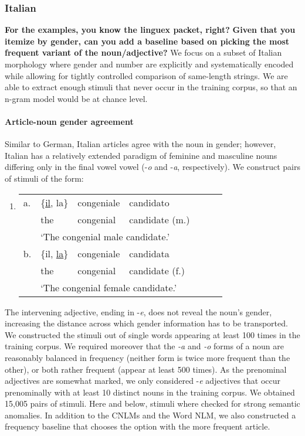 
\subsubsection{Italian} %
\textbf{For the examples, you know the linguex packet, right?}
\textbf{Given that you itemize by gender, can you add a baseline based
  on picking the most frequent variant of the noun/adjective?} We
focus on a subset of Italian morphology where gender and number are
explicitly and systematically encoded while allowing for tightly
controlled comparison of same-length strings. We are able to extract
enough stimuli that never occur in the training corpus, so that an
n-gram model would be at chance level.

\paragraph{Article-noun gender agreement}

Similar to German, Italian articles agree with the noun in gender; however, Italian has a relatively extended paradigm of feminine and masculine nouns differing only in the final vowel vowel (-\emph{o} and -\emph{a}, respectively). We construct pairs of stimuli of the form:
\begin{enumerate}[label={(\arabic*)}]
	\item 
		\begin{tabular}[t]{lllllll}
	a. & \{\underline{il}, la\} & congeniale & candidato \\
   &  the & congenial & candidate (m.) \\
	& \multicolumn{4}{l}{`The congenial male candidate.'} \\
	b. & \{il, \underline{la}\} & congeniale & candidata \\
    &the & congenial & candidate (f.) \\
	& \multicolumn{4}{l}{`The congenial female candidate.'} \\
\end{tabular}
\end{enumerate}

The intervening adjective, ending in -\emph{e}, does not reveal the
noun's gender, increasing the distance across which gender information
has to be transported. We constructed the stimuli out of single words
appearing at least 100 times in the training corpus. We required
moreover that the \emph{-a} and \emph{-o} forms of a noun are
reasonably balanced in frequency (neither form is twice more frequent
than the other), or both rather frequent (appear at least 500
times). As the prenominal adjectives are somewhat marked, we only
considered -\emph{e} adjectives that occur prenominally with at least
10 distinct nouns in the training corpus. We obtained 15,005 pairs of stimuli.
Here and below, stimuli
where checked for strong semantic anomalies.
In addition to the CNLMs and the Word NLM, we also constructed a frequency baseline that chooses the option with the more frequent article.

